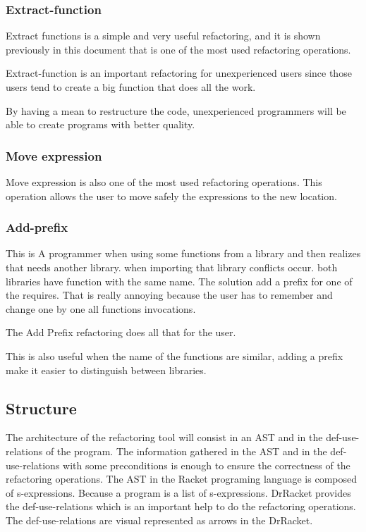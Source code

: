 \subsubsection{Extract-function}

Extract functions is a simple and very useful refactoring, and it is shown previously in this document that is one of the most used refactoring operations.

Extract-function is an important refactoring for unexperienced users since those users tend to create a big function that does all the work.

By having a mean to restructure the code, unexperienced programmers will be able to create programs with better quality.




\subsubsection{Move expression}

Move expression is also one of the most used refactoring operations.
This operation allows the user to move safely the expressions to the new location.



\subsubsection{Add-prefix}
This is 
A programmer when using some functions from a library and then realizes that needs another library. when importing that library conflicts occur.
both libraries have function with the same name. The solution add a prefix for one of the requires.
That is really annoying because the user has to remember and change one by one all functions invocations.

The Add Prefix refactoring does all that for the user.

This is also useful when the name of the functions are similar, adding a prefix make it easier to distinguish between libraries.





\subsection{Structure}

The architecture of the refactoring tool will consist in an AST and in the def-use-relations of the program.
The information gathered in the AST and in the def-use-relations with some preconditions is enough to ensure the correctness of the refactoring operations.
The AST in the Racket programing language is composed of s-expressions. Because a program is a list of s-expressions.
DrRacket provides the def-use-relations which is an important help to do the refactoring operations. The def-use-relations are visual represented as arrows in the DrRacket.

